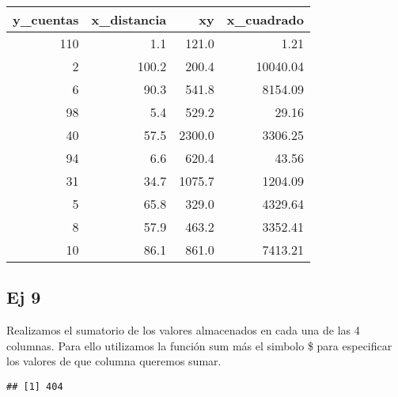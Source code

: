 \documentclass[
]{article}
\newenvironment{Shaded}{\begin{snugshade}}{\end{snugshade}}
\newcommand{\FunctionTok}[1]{\textcolor[rgb]{0.00,0.00,0.00}{#1}}
\newcommand{\NormalTok}[1]{#1}
\newcommand{\OtherTok}[1]{\textcolor[rgb]{0.56,0.35,0.01}{#1}}
\newcommand{\SpecialCharTok}[1]{\textcolor[rgb]{0.00,0.00,0.00}{#1}}
\begin{document}
\begin{table}
\centering
\begin{tabular}[t]{r|r|r|r}
\hline
y\_cuentas & x\_distancia & xy & x\_cuadrado\\
\hline
110 & 1.1 & 121.0 & 1.21\\
\hline
2 & 100.2 & 200.4 & 10040.04\\
\hline
6 & 90.3 & 541.8 & 8154.09\\
\hline
98 & 5.4 & 529.2 & 29.16\\
\hline
40 & 57.5 & 2300.0 & 3306.25\\
\hline
94 & 6.6 & 620.4 & 43.56\\
\hline
31 & 34.7 & 1075.7 & 1204.09\\
\hline
5 & 65.8 & 329.0 & 4329.64\\
\hline
8 & 57.9 & 463.2 & 3352.41\\
\hline
10 & 86.1 & 861.0 & 7413.21\\
\hline
\end{tabular}
\end{table}

\hypertarget{ej-9}{%
\subsection{Ej 9}\label{ej-9}}

Realizamos el sumatorio de los valores almacenados en cada una de las 4
columnas. Para ello utilizamos la función sum más el simbolo \$ para
especificar los valores de que columna queremos sumar.

\begin{Shaded}
\end{Shaded}

\begin{verbatim}
## [1] 404
\end{verbatim}

\begin{Shaded}
\end{Shaded}
\end{document}
